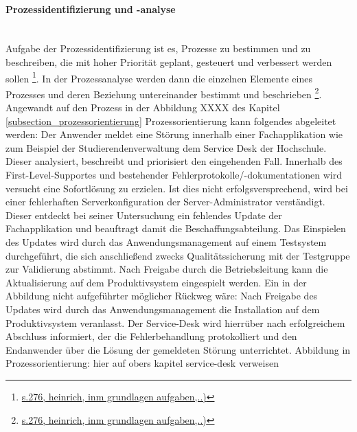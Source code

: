 \paragraph{Prozessidentifizierung und -analyse}\mbox{}\\
Aufgabe der Prozessidentifizierung ist es, Prozesse zu bestimmen und zu beschreiben, die mit hoher Priorität geplant, gesteuert und verbessert werden sollen \footnote{\url{s.276, heinrich, inm grundlagen aufgaben,..)}}. In der Prozessanalyse werden dann die einzelnen Elemente eines Prozesses und deren Beziehung untereinander bestimmt und beschrieben \footnote{\url{s.276, heinrich, inm grundlagen aufgaben,..)}}.
Angewandt auf den Prozess in der Abbildung XXXX des Kapitel \ref{subsection_prozessorientierung} Prozessorientierung kann folgendes abgeleitet werden:
Der Anwender meldet eine Störung innerhalb einer Fachapplikation wie zum Beispiel der Studierendenverwaltung dem Service Desk der Hochschule. Dieser analysiert, beschreibt und priorisiert den eingehenden Fall. Innerhalb des First-Level-Supportes und bestehender Fehlerprotokolle/-dokumentationen wird versucht eine Sofortlösung zu erzielen. Ist dies nicht erfolgsversprechend, wird bei einer fehlerhaften Serverkonfiguration der Server-Administrator verständigt. Dieser entdeckt bei seiner Untersuchung ein fehlendes Update der Fachapplikation und beauftragt damit die Beschaffungsabteilung. Das Einspielen des Updates wird durch das Anwendungsmanagement auf einem Testsystem durchgeführt, die sich anschließend zwecks Qualitätssicherung mit der Testgruppe zur Validierung abstimmt. Nach Freigabe durch die Betriebsleitung kann die Aktualisierung auf dem Produktivsystem eingespielt werden.
Ein in der Abbildung nicht aufgeführter möglicher Rückweg wäre: Nach Freigabe des Updates wird durch das Anwendungsmanagement die Installation auf dem Produktivsystem veranlasst. Der Service-Desk wird hierrüber nach erfolgreichem Abschluss informiert, der die Fehlerbehandlung protokolliert und den Endanwender über die Lösung der gemeldeten Störung unterrichtet. 
Abbildung in Prozessorientierung: hier auf obers kapitel service-desk verweisen


